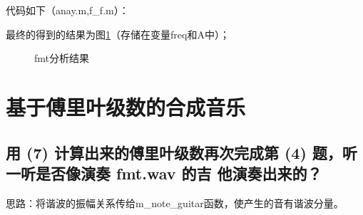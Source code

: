 \documentclass{ctexart}
\begin{document}
			代码如下（anay.m,f\_f.m）：
        
        
        最终的得到的结果为图\ref{19sheet}（存储在变量freq和A中）；
        \begin{figure}
            \centering
            \caption{fmt分析结果\label{19sheet}}
        \end{figure}

\section{
    基于傅里叶级数的合成音乐
}
\setcounter{subsection}{9} 
    \subsection{
            用 (7) 计算出来的傅里叶级数再次完成第 (4) 题，听一听是否像演奏 fmt.wav 的吉
            他演奏出来的？
        }
        思路：将谐波的振幅关系传给m\_note\_guitar函数，使产生的音有谐波分量。
        
\end{document}
